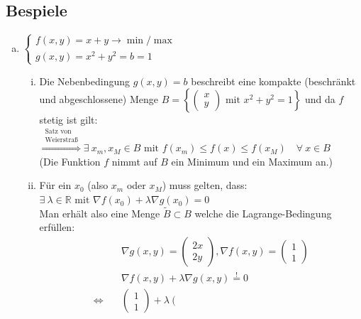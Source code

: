 \documentclass[11pt,a4paper]{book}
\newcommand {\R}	{\mathbb{R}}
\newcommand{\1}    	{\mathbbm{1}}
\newcommand{\mitt}	{\textrm{ mit }}
\begin{document}
\subsection{Bespiele}
\begin{enumerate}[a.~]
	\item \( \left\{ \begin{array}{l}
		f(x,y) = x+y \rightarrow \min/\max \\
		g(x,y) = x^2 + y^2 = b = 1
	\end{array} \right. \)
	\begin{enumerate}[(i)]
		\item Die Nebenbedingung \(g(x,y) = b\) beschreibt eine kompakte (beschränkt und abgeschlossene) Menge 
		\(B = \left\{ \left( \begin{array}{c} x \\ y \end{array} \right) \mitt x^2 + y^2 = 1 \right\}\) und da \(f\) stetig ist gilt: \\
		\(\stackrel{\substack{\textrm{Satz von}\\\textrm{Weierstraß}}}{\Rightarrow} \exists~ x_m, x_M \in B \mitt f(x_m) \leqslant f(x) \leqslant f(x_M) \quad \forall~ x \in B\) \\
		(Die Funktion \(f\) nimmt auf \(B\) ein Minimum und ein Maximum an.)
		\item Für ein \(x_0\) (also \(x_m\) oder \(x_M\)) muss gelten, dass: \\
		\( \exists~ \lambda \in \R \mitt \nabla f(x_0) + \lambda \nabla g(x_0) = 0\)\\
		Man erhält also eine Menge \(\tilde{B} \subset B\) welche die Lagrange-Bedingung erfüllen:
		\begin{align*}
			&\nabla g(x,y) = \left( \begin{array}{c}
				2x \\ 2y
			\end{array} \right),  
			\nabla f(x,y) = \left( \begin{array}{c}
				1 \\ 1			
			\end{array} \right) \\
			& \nabla f(x,y) + \lambda \nabla g(x,y) \stackrel{!}{=} 0 \\
			\Leftrightarrow\quad& \left( \begin{array}{c}
				1 \\ 1
			\end{array} \right) + \lambda
			\left( \begin{array}{c}

\end{array}
\end{align*}
\end{enumerate}
\end{enumerate}
\end{document}
